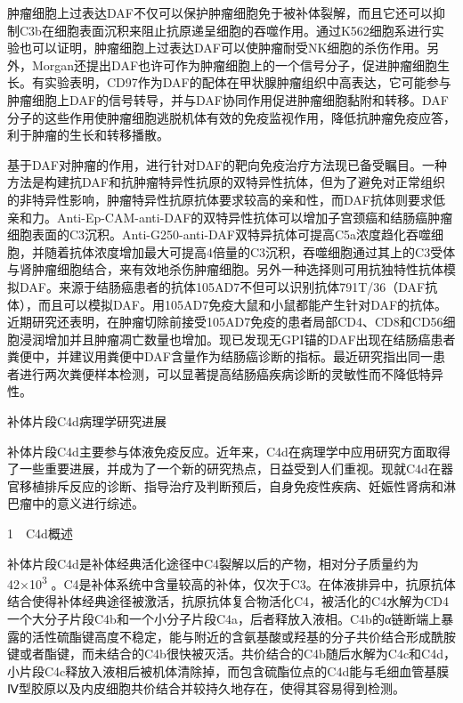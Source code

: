 肿瘤细胞上过表达DAF不仅可以保护肿瘤细胞免于被补体裂解，而且它还可以抑制C3b在细胞表面沉积来阻止抗原递呈细胞的吞噬作用。通过K562细胞系进行实验也可以证明，肿瘤细胞上过表达DAF可以使肿瘤耐受NK细胞的杀伤作用。另外，Morgan还提出DAF也许可作为肿瘤细胞上的一个信号分子，促进肿瘤细胞生长。有实验表明，CD97作为DAF的配体在甲状腺肿瘤组织中高表达，它可能参与肿瘤细胞上DAF的信号转导，并与DAF协同作用促进肿瘤细胞黏附和转移。DAF分子的这些作用使肿瘤细胞逃脱机体有效的免疫监视作用，降低抗肿瘤免疫应答，利于肿瘤的生长和转移播散。

基于DAF对肿瘤的作用，进行针对DAF的靶向免疫治疗方法现已备受瞩目。一种方法是构建抗DAF和抗肿瘤特异性抗原的双特异性抗体，但为了避免对正常组织的非特异性影响，肿瘤特异性抗原抗体要求较高的亲和性，而DAF抗体则要求低亲和力。Anti-Ep-CAM-anti-DAF的双特异性抗体可以增加子宫颈癌和结肠癌肿瘤细胞表面的C3沉积。Anti-G250-anti-DAF双特异抗体可提高C5a浓度趋化吞噬细胞，并随着抗体浓度增加最大可提高4倍量的C3沉积，吞噬细胞通过其上的C3受体与肾肿瘤细胞结合，来有效地杀伤肿瘤细胞。另外一种选择则可用抗独特性抗体模拟DAF。来源于结肠癌患者的抗体105AD7不但可以识别抗体791T/36（DAF抗体），而且可以模拟DAF。用105AD7免疫大鼠和小鼠都能产生针对DAF的抗体。近期研究还表明，在肿瘤切除前接受105AD7免疫的患者局部CD4、CD8和CD56细胞浸润增加并且肿瘤凋亡数量也增加。现已发现无GPI锚的DAF出现在结肠癌患者粪便中，并建议用粪便中DAF含量作为结肠癌诊断的指标。最近研究指出同一患者进行两次粪便样本检测，可以显著提高结肠癌疾病诊断的灵敏性而不降低特异性。

\begin{center}
{\Large 补体片段C4d病理学研究进展}
\end{center}

补体片段C4d主要参与体液免疫反应。近年来，C4d在病理学中应用研究方面取得了一些重要进展，并成为了一个新的研究热点，日益受到人们重视。现就C4d在器官移植排斥反应的诊断、指导治疗及判断预后，自身免疫性疾病、妊娠性肾病和淋巴瘤中的意义进行综述。

1　C4d概述

补体片段C4d是补体经典活化途径中C4裂解以后的产物，相对分子质量约为42×10\textsuperscript{3}
。C4是补体系统中含量较高的补体，仅次于C3。在体液排异中，抗原抗体结合使得补体经典途径被激活，抗原抗体复合物活化C4，被活化的C4水解为CD4一个大分子片段C4b和一个小分子片段C4a，后者释放入液相。C4b的α链断端上暴露的活性硫酯键高度不稳定，能与附近的含氨基酸或羟基的分子共价结合形成酰胺键或者酯键，而未结合的C4b很快被灭活。共价结合的C4b随后水解为C4c和C4d，小片段C4c释放入液相后被机体清除掉，而包含硫酯位点的C4d能与毛细血管基膜Ⅳ型胶原以及内皮细胞共价结合并较持久地存在，使得其容易得到检测。

